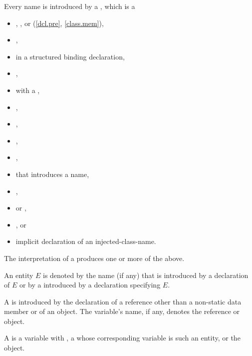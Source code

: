 \pnum
Every name is introduced by a , which is a
\begin{itemize}
\item
{},
, or
 (\ref{dcl.pre}, \ref{class.mem}),
\item
{},
\item
{}
in a structured binding declaration,
\item
{},
\item
{} with a ,
\item
{},
\item
{},
\item
{},
\item
{},
\item
{}
that introduces a name,
\item
{},
\item
{} or
,
\item
{}, or
\item
implicit declaration of an injected-class-name.
\end{itemize}
\begin{note}
The interpretation of a  produces
one or more of the above.
\end{note}
An entity $E$ is denoted by the name (if any)
that is introduced by a declaration of $E$ or
by a  introduced by a declaration specifying $E$.

\pnum
A  is introduced by the
declaration of
a reference other than a non-static data member or of
an object. The variable's name, if any, denotes the reference or object.

\pnum
A  is a variable with
,
a 
whose corresponding variable is such an entity,
or the  object.

